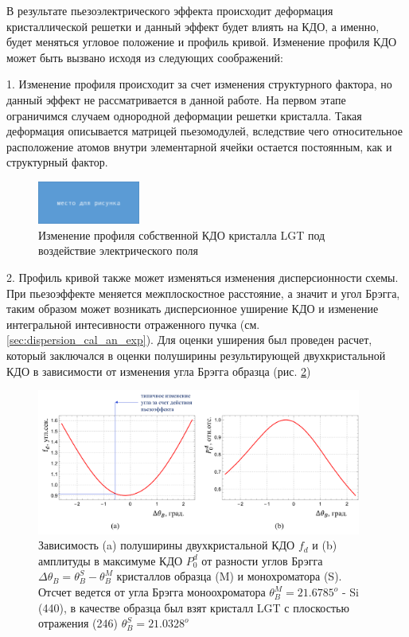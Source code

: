 В результате пьезоэлектрического эффекта происходит деформация
кристаллической решетки и данный эффект будет влиять на
КДО, а именно, будет меняться  угловое положение и профиль кривой.
Изменение профиля КДО может быть вызвано исходя из следующих
соображений:

1. Изменение профиля происходит за счет изменения структурного фактора, но
данный эффект не рассматривается в данной работе. На первом этапе ограничимся
случаем однородной деформации решетки кристалла. Такая деформация описывается
 матрицей пьезомодулей, вследствие чего относительное расположение атомов
 внутри элементарной ячейки остается постоянным, как и структурный фактор.

 \begin{figure}[H]
   \centering
   \includegraphics[width=0.3\textwidth]{images/none.png}
   \caption{Изменение профиля собственной КДО кристалла LGT под воздействие электрического поля}
   \label{ris:self_kdo_deformation}
 \end{figure}


2. Профиль кривой также может изменяться изменения дисперсионности схемы.
При пьезоэффекте меняется межплоскостное расстояние, а значит и угол Брэгга, таким
образом может возникать дисперсионное уширение КДО и изменение интегральной интесивности
отраженного пучка (см. \ref{sec:dispersion_cal_an_exp}). Для оценки уширения был
проведен расчет, который заключался в оценки полуширины результирующей двухкристальной КДО
в зависимости от изменения угла Брэгга образца (рис. \ref{ris:FWHM_diference_bragg})
\begin{figure}[H]
  \centering
  \includegraphics[width=0.95\textwidth]{images/delta_bragg_dispers.png}
  \caption{Зависимость (a) полуширины двухкристальной КДО $f_d$ и (b) амплитуды в максимуме КДО  $P^d_0$
   от разности углов Брэгга $\Delta\theta_B =\theta_B^S-\theta_B^M $ кристаллов
  образца (M) и монохроматора (S). Отсчет ведется от угла Брэгга моноохроматора $\theta_B^M = 21.6785 ^o$ - Si (440),
  в качестве образца был взят кристалл LGT с плоскостью отражения (246) $\theta_B^S = 21.0328 ^o$}
  \label{ris:FWHM_diference_bragg}
\end{figure}

